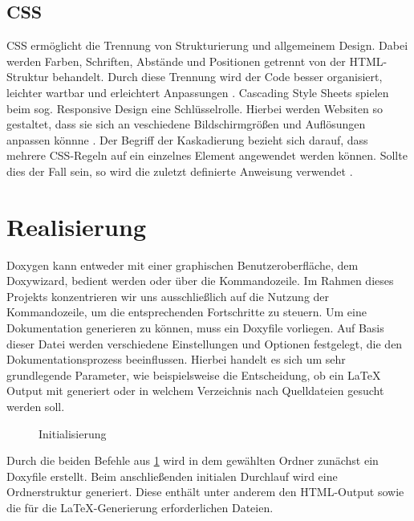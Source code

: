 \documentclass[11pt,a4paper]{report}
\begin{document}
\subsection{CSS} \label{sec:CSS}
CSS ermöglicht die Trennung von Strukturierung und allgemeinem Design. Dabei werden Farben, Schriften, Abstände und Positionen getrennt von der HTML-Struktur behandelt. Durch diese Trennung wird der Code besser organisiert, leichter wartbar und erleichtert Anpassungen \cite{CSS_Tutorial}. Cascading Style Sheets spielen beim sog. Responsive Design eine Schlüsselrolle. Hierbei werden Websiten so gestaltet, dass sie sich an veschiedene Bildschirmgrößen und Auflösungen anpassen könnne \cite{CSS_Responsive_Design}. Der Begriff der Kaskadierung bezieht sich darauf, dass mehrere CSS-Regeln auf ein einzelnes Element angewendet werden können. Sollte dies der Fall sein, so wird die zuletzt definierte Anweisung verwendet \cite{CSS_Tutorial}.

\section{Realisierung}
Doxygen kann entweder mit einer graphischen Benutzeroberfläche, dem \glqq Doxywizard\grqq{}, bedient werden oder über die Kommandozeile. Im Rahmen dieses Projekts konzentrieren wir uns ausschließlich auf die Nutzung der Kommandozeile, um die entsprechenden Fortschritte zu steuern. Um eine Dokumentation generieren zu können, muss ein \glqq Doxyfile\grqq{} vorliegen. Auf Basis dieser Datei werden verschiedene Einstellungen und Optionen festgelegt, die den Dokumentationsprozess beeinflussen. Hierbei handelt es sich um sehr grundlegende Parameter, wie beispielsweise die Entscheidung, ob ein LaTeX Output mit generiert oder in welchem Verzeichnis nach Quelldateien gesucht werden soll.
\begin{figure}[h]
  \centering
  \hfill
  \caption{Initialisierung}
  \label{fig:doxygen-init}
\end{figure}

\noindent
Durch die beiden Befehle aus \ref{fig:doxygen-init} wird in dem gewählten Ordner zunächst ein Doxyfile erstellt. Beim anschließenden initialen Durchlauf wird eine Ordnerstruktur generiert. Diese enthält unter anderem den HTML-Output sowie die für die LaTeX-Generierung erforderlichen Dateien.
\end{document}
